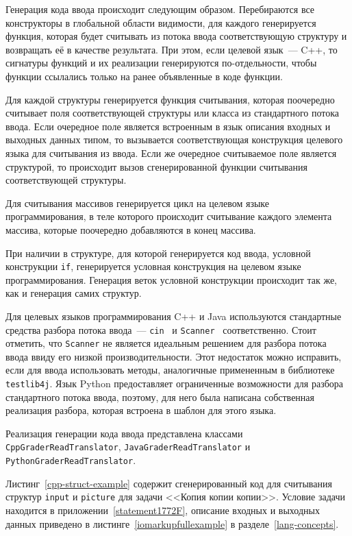 \documentclass[times,specification,annotation]{style/itmo-student-thesis/itmo-student-thesis}
\begin{document}
Генерация кода ввода происходит следующим образом. Перебираются все конструкторы в глобальной области видимости, для каждого генерируется функция, которая будет считывать из потока ввода соответствующую структуру и возвращать её в качестве результата. При этом, если целевой язык~--- C++, то сигнатуры функций и их реализации генерируются по-отдельности, чтобы функции ссылались только на ранее объявленные в коде функции.

Для каждой структуры генерируется функция считывания, которая поочередно считывает поля соответствующей структуры или класса из стандартного потока ввода. Если очередное поле является встроенным в язык описания входных и выходных данных типом, то вызывается соответствующая конструкция целевого языка для считывания из ввода. Если же очередное считываемое поле является структурой, то происходит вызов сгенерированной функции считывания соответствующей структуры.

Для считывания массивов генерируется цикл на целевом языке программирования, в теле которого происходит считывание каждого элемента массива, которые поочередно добавляются в конец массива.

При наличии в структуре, для которой генерируется код ввода, условной конструкции \texttt{if}, генерируется условная конструкция на целевом языке программирования. Генерация веток условной конструкции происходит так же, как и генерация самих структур.

Для целевых языков программирования C++ и Java используются стандартные средства разбора потока ввода~--- \texttt{cin}~\cite{cppcin} и \texttt{Scanner}~\cite{javascanner} соответственно. Стоит отметить, что \texttt{Scanner} не является идеальным решением для разбора потока ввода ввиду его низкой производительности. Этот недостаток можно исправить, если для ввода использовать методы, аналогичные примененным в библиотеке \texttt{testlib4j}. Язык Python предоставляет ограниченные возможности для разбора стандартного потока ввода, поэтому, для него была написана собственная реализация разбора, которая встроена в шаблон для этого языка.

Реализация генерации кода ввода представлена классами \texttt{CppGraderReadTranslator}, \texttt{JavaGraderReadTranslator} и \texttt{PythonGraderReadTranslator}.

Листинг~\ref{cpp-struct-example} содержит сгенерированный код для считывания структур \texttt{input} и \texttt{picture} для задачи <<Копия копии копии>>. Условие задачи находится в приложении~\ref{statement1772F}, описание входных и выходных данных приведено в листинге~\ref{iomarkupfullexample} в разделе~\ref{lang-concepts}.
\end{document}

